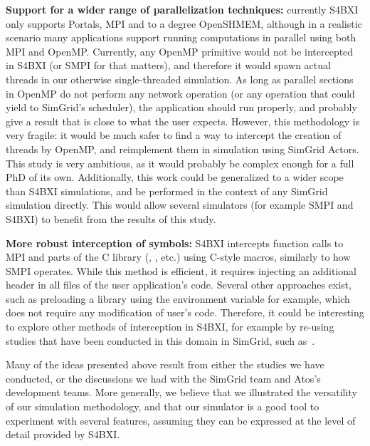 \textbf{Support for a wider range of parallelization techniques:} currently
S4BXI only supports Portals, MPI and to a degree OpenSHMEM, although in a
realistic scenario many applications support running computations in parallel
using both MPI and OpenMP. Currently, any OpenMP primitive would not be
intercepted in S4BXI (or SMPI for that matters), and therefore it would spawn
actual threads in our otherwise single-threaded simulation. As long as parallel
sections in OpenMP do not perform any network operation (or any operation that
could yield to SimGrid's scheduler), the application should run properly, and
probably give a result that is close to what the user expects. However, this
methodology is very fragile: it would be much safer to find a way to intercept
the creation of threads by OpenMP, and reimplement them in simulation using
SimGrid Actors. This study is very ambitious, as it would probably be complex
enough for a full PhD of its own. Additionally, this work could be generalized
to a wider scope than S4BXI simulations, and be performed in the context of any
SimGrid simulation directly. This would allow several simulators (for example
SMPI and S4BXI) to benefit from the results of this study.

\bigskip

\textbf{More robust interception of symbols:} S4BXI intercepts function calls to
MPI and parts of the C library (, , etc.)
using C-style  macros, similarly to how SMPI operates. While
this method is efficient, it requires injecting an additional header in all
files of the user application's code. Several other approaches exist, such as
preloading a library using the  environment variable for
example, which does not require any modification of user's code. Therefore, it
could be interesting to explore other methods of interception in S4BXI, for
example by re-using studies that have been conducted in this domain in SimGrid,
such as~\cite{Bessad2015}.

\bigskip

Many of the ideas presented above result from either the studies we have
conducted, or the discussions we had with the SimGrid team and Atos's
development teams. More generally, we believe that we illustrated the
versatility of our simulation methodology, and that our simulator is a good tool
to experiment with several features, assuming they can be expressed at the level
of detail provided by S4BXI.